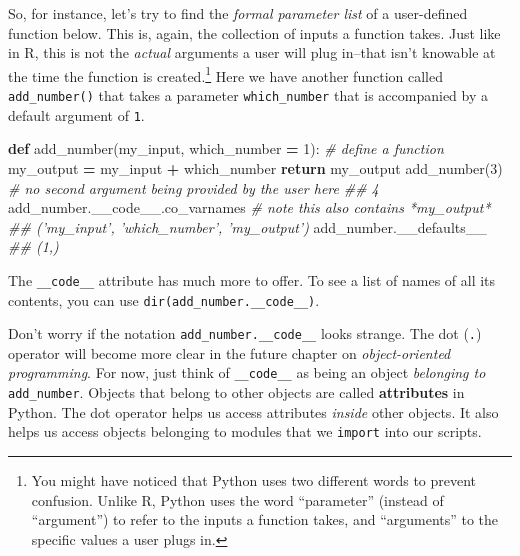 \documentclass[12pt,krantz2]{krantz}
\makeatletter
\newenvironment{Shaded}{\begin{snugshade}}{\end{snugshade}}
\newcommand{\CommentTok}[1]{\textcolor[rgb]{0.37,0.37,0.37}{\textit{#1}}}
\newcommand{\ControlFlowTok}[1]{\textcolor[rgb]{0.27,0.27,0.27}{\textbf{#1}}}
\newcommand{\DecValTok}[1]{\textcolor[rgb]{0.06,0.06,0.06}{#1}}
\newcommand{\KeywordTok}[1]{\textcolor[rgb]{0.27,0.27,0.27}{\textbf{#1}}}
\newcommand{\NormalTok}[1]{#1}
\newcommand{\OperatorTok}[1]{\textcolor[rgb]{0.43,0.43,0.43}{\textbf{#1}}}
\newenvironment{kframe}{%
\medskip{}
\setlength{\fboxsep}{.8em}
 \def\at@end@of@kframe{}%
 \ifinner\ifhmode%
  \def\at@end@of@kframe{\end{minipage}}%
  \begin{minipage}{\columnwidth}%
 \fi\fi%
 \def\FrameCommand##1{\hskip\@totalleftmargin \hskip-\fboxsep
 \colorbox{shadecolor}{##1}\hskip-\fboxsep
     \hskip-\linewidth \hskip-\@totalleftmargin \hskip\columnwidth}%
 \MakeFramed {\advance\hsize-\width
   \@totalleftmargin\z@ \linewidth\hsize
   \@setminipage}}%
 {\par\unskip\endMakeFramed%
 \at@end@of@kframe}
\renewenvironment{Shaded}{\begin{kframe}}{\end{kframe}}
\makeatother
\begin{document}
So, for instance, let's try to find the \emph{formal parameter list} of a user-defined function below. This is, again, the collection of inputs a function takes. Just like in R, this is not the \emph{actual} arguments a user will plug in--that isn't knowable at the time the function is created.\footnote{You might have noticed that Python uses two different words to prevent confusion. Unlike R, Python uses the word ``parameter'' (instead of ``argument'') to refer to the inputs a function takes, and ``arguments'' to the specific values a user plugs in.} Here we have another function called \texttt{add\_number()} that takes a parameter \texttt{which\_number} that is accompanied by a default argument of \texttt{1}.

\begin{Shaded}
\begin{Highlighting}[]
\KeywordTok{def}\NormalTok{ add_number(my_input, which_number }\OperatorTok{=} \DecValTok{1}\NormalTok{): }\CommentTok{# define a function}
\NormalTok{    my_output }\OperatorTok{=}\NormalTok{ my_input }\OperatorTok{+}\NormalTok{ which_number}
    \ControlFlowTok{return}\NormalTok{ my_output}
\NormalTok{add_number(}\DecValTok{3}\NormalTok{) }\CommentTok{# no second argument being provided by the user here}
\CommentTok{## 4}
\NormalTok{add_number.__code__.co_varnames }\CommentTok{# note this also contains *my_output*}
\CommentTok{## ('my_input', 'which_number', 'my_output')}
\NormalTok{add_number.__defaults__}
\CommentTok{## (1,)}
\end{Highlighting}
\end{Shaded}

The \texttt{\_\_code\_\_} attribute has much more to offer. To see a list of names of all its contents, you can use \texttt{dir(add\_number.\_\_code\_\_)}.

\begin{rmd-details}
Don't worry if the notation \texttt{add\_number.\_\_code\_\_} looks strange. The dot (\texttt{.}) operator will become more clear in the future chapter on \emph{object-oriented programming}. For now, just think of \texttt{\_\_code\_\_} as being an object \emph{belonging to} \texttt{add\_number}. Objects that belong to other objects are called \textbf{attributes} in Python. The dot operator helps us access attributes \emph{inside} other objects. It also helps us access objects belonging to modules that we \texttt{import} into our scripts.

\end{rmd-details}
\end{document}
